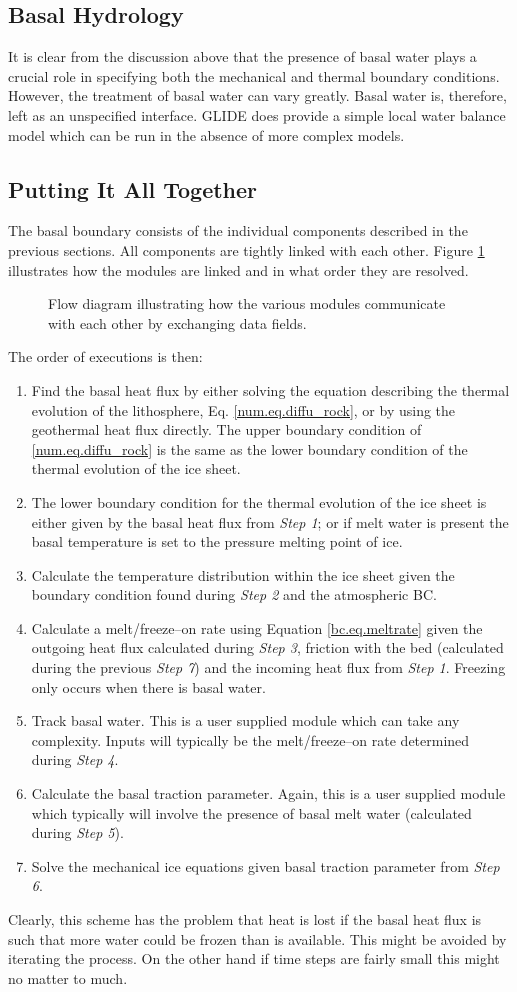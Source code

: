 

\subsection{Basal Hydrology}
It is clear from the discussion above that the presence of basal water plays a crucial role in specifying both the mechanical and thermal boundary conditions. However, the treatment of basal water can vary greatly. Basal water is, therefore, left as an unspecified interface. GLIDE does provide a simple local water balance model which can be run in the absence of more complex models.

\subsection{Putting It All Together}
The basal boundary consists of the individual components described in the previous sections. All components are tightly linked with each other. Figure \ref{num.fig.bc_flow} illustrates how the modules are linked and in what order they are resolved.
\begin{figure}[htbp]
  \centering
  \caption{Flow diagram illustrating how the various modules communicate with each other by exchanging data fields.}
  \label{num.fig.bc_flow}
\end{figure}
The order of executions is then:
\begin{enumerate}
\item Find the basal heat flux by either solving the equation describing the thermal evolution of the lithosphere, Eq. \eqref{num.eq.diffu_rock}, or by using the geothermal heat flux directly. The upper boundary condition of \eqref{num.eq.diffu_rock} is the same as the lower boundary condition of the thermal evolution of the ice sheet.
\item The lower boundary condition for the thermal evolution of the ice sheet is either given by the basal heat flux from \emph{Step 1}; or if melt water is present the basal temperature is set to the pressure melting point of ice.
\item Calculate the temperature distribution within the ice sheet given the boundary condition found during \emph{Step 2} and the atmospheric BC.
\item Calculate a melt/freeze--on rate using Equation \eqref{bc.eq.meltrate} given the outgoing heat flux calculated during \emph{Step 3}, friction with the bed (calculated during the previous \emph{Step 7}) and the incoming heat flux from \emph{Step 1}. Freezing only occurs when there is basal water.
\item Track basal water. This is a user supplied module which can take any complexity. Inputs will typically be the melt/freeze--on rate determined during \emph{Step 4}.
\item Calculate the basal traction parameter. Again, this is a user supplied module which typically will involve the presence of basal melt water (calculated during \emph{Step 5}).
\item Solve the mechanical ice equations given basal traction parameter from \emph{Step 6}.
\end{enumerate}
Clearly, this scheme has the problem that heat is lost if the basal heat flux is such that more water could be frozen than is available. This might be avoided by iterating the process. On the other hand if time steps are fairly small this might no matter to much.
